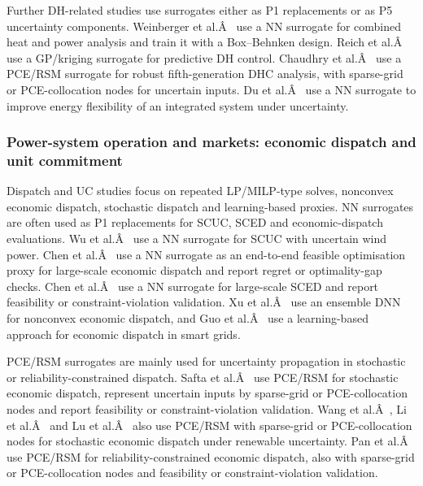 \documentclass[final,5p,times,twocolumn]{elsarticle}
\begin{document}
Further DH-related studies use surrogates either as P1 replacements or
as P5 uncertainty components. Weinberger et al.Â~\cite{Weinberger2018555} use
a NN surrogate for combined heat and power analysis and train it with a
Box--Behnken design. Reich et al.Â~\cite{Reich2020} use a GP/kriging
surrogate for predictive DH control. Chaudhry et al.Â~\cite{Chaudhry2024} use
a PCE/RSM surrogate for robust fifth-generation DHC analysis, with
sparse-grid or PCE-collocation nodes for uncertain inputs. Du et
al.Â~\cite{Du2025} use a NN surrogate to improve energy flexibility of an
integrated system under uncertainty.

\subsubsection{Power-system operation and markets: economic dispatch and unit commitment}
\label{sec:apps:dispatch}

Dispatch and UC studies focus on repeated LP/MILP-type solves, nonconvex
economic dispatch, stochastic dispatch and learning-based proxies. NN
surrogates are often used as P1 replacements for SCUC, SCED and
economic-dispatch evaluations. Wu et al.Â~\cite{Wu2022231} use a NN surrogate
for SCUC with uncertain wind power. Chen et al.Â~\cite{Chen20244723} use a NN
surrogate as an end-to-end feasible optimisation proxy for large-scale
economic dispatch and report regret or optimality-gap checks. Chen et
al.Â~\cite{Chen2022} use a NN surrogate for large-scale SCED and report
feasibility or constraint-violation validation. Xu et al.Â~\cite{Xu20223066}
use an ensemble DNN for nonconvex economic dispatch, and Guo et
al.Â~\cite{Guo202115024} use a learning-based approach for economic dispatch
in smart grids.

PCE/RSM surrogates are mainly used for uncertainty propagation in
stochastic or reliability-constrained dispatch. Safta et
al.Â~\cite{Safta20172535} use PCE/RSM for stochastic economic dispatch,
represent uncertain inputs by sparse-grid or PCE-collocation nodes and
report feasibility or constraint-violation validation. Wang et
al.Â~\cite{Wang2022812}, Li et al.Â~\cite{Li20191438} and Lu et al.Â~\cite{Lu201991827}
also use PCE/RSM with sparse-grid or PCE-collocation nodes for
stochastic economic dispatch under renewable uncertainty. Pan et
al.Â~\cite{Pan20244422} use PCE/RSM for reliability-constrained economic
dispatch, also with sparse-grid or PCE-collocation nodes and feasibility
or constraint-violation validation.
\end{document}

